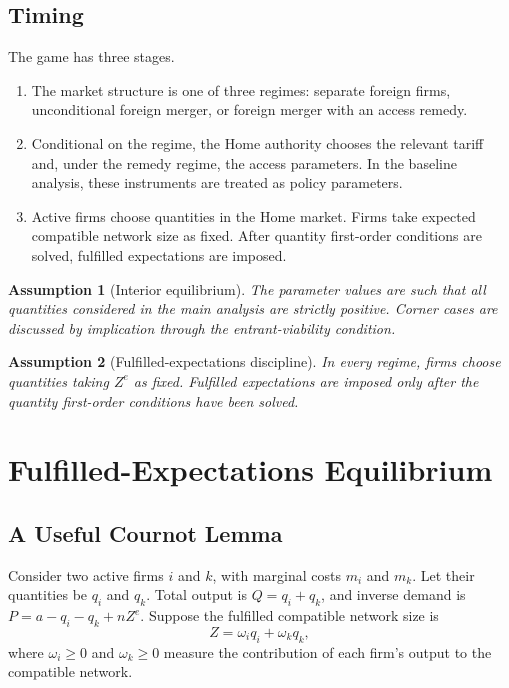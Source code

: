 \documentclass[12pt]{article}
\newtheorem{assumption}{Assumption}
\begin{document}
\subsection{Timing}

The game has three stages.
\begin{enumerate}[label=(\roman*)]
    \item The market structure is one of three regimes: separate foreign firms, unconditional foreign merger, or foreign merger with an access remedy.
    \item Conditional on the regime, the Home authority chooses the relevant tariff and, under the remedy regime, the access parameters. In the baseline analysis, these instruments are treated as policy parameters.
    \item Active firms choose quantities in the Home market. Firms take expected compatible network size as fixed. After quantity first-order conditions are solved, fulfilled expectations are imposed.
\end{enumerate}

\begin{assumption}[Interior equilibrium]
The parameter values are such that all quantities considered in the main analysis are strictly positive. Corner cases are discussed by implication through the entrant-viability condition.
\end{assumption}

\begin{assumption}[Fulfilled-expectations discipline]
In every regime, firms choose quantities taking $Z^e$ as fixed. Fulfilled expectations are imposed only after the quantity first-order conditions have been solved.
\end{assumption}

\section{Fulfilled-Expectations Equilibrium}\label{sec:equilibrium}

\subsection{A Useful Cournot Lemma}

Consider two active firms $i$ and $k$, with marginal costs $m_i$ and $m_k$. Let their quantities be $q_i$ and $q_k$. Total output is $Q=q_i+q_k$, and inverse demand is $P=a-q_i-q_k+nZ^e$. Suppose the fulfilled compatible network size is
\begin{equation}
Z=\omega_iq_i+\omega_kq_k,
\end{equation}
where $\omega_i\geq0$ and $\omega_k\geq0$ measure the contribution of each firm's output to the compatible network.
\end{document}

